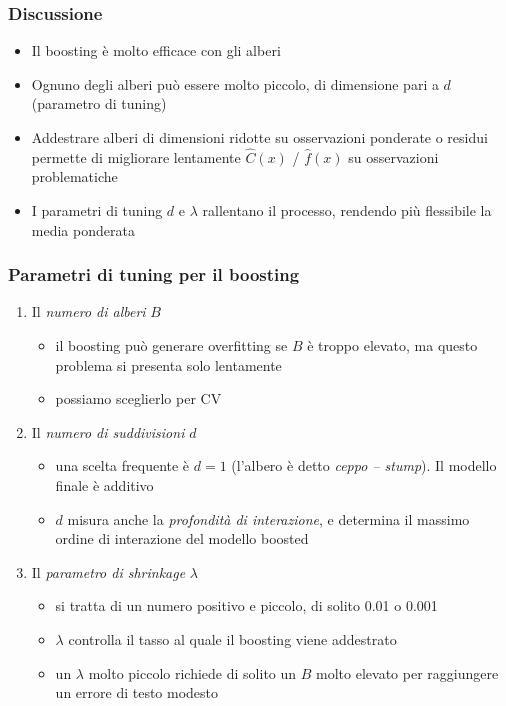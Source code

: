 \begin{frame}
	\frametitle{Discussione}
	
	\begin{itemize}
		\item Il boosting è molto efficace con gli alberi
		\item Ognuno degli alberi può essere molto piccolo, di dimensione pari a $d$ (parametro di tuning)
		\item Addestrare alberi di dimensioni ridotte su osservazioni ponderate o residui permette di migliorare lentamente $\widehat C(x)$ / $\widehat f(x)$ su osservazioni problematiche
		\item I parametri di tuning $d$ e $\lambda$ rallentano il processo, rendendo più flessibile la media ponderata
	\end{itemize}
\end{frame}


\begin{frame}
	\frametitle{Parametri di tuning per il boosting}
	
	\begin{enumerate}
		\item Il \emph{numero di alberi} $B$
			\begin{itemize}
				\item il boosting può generare overfitting se $B$ è troppo elevato, ma questo problema si presenta solo lentamente
				\item possiamo sceglierlo per CV
			\end{itemize}
		\item Il \emph{numero di suddivisioni} $d$
			\begin{itemize}
				\item una scelta frequente è $d = 1$ (l'albero è detto \emph{ceppo -- stump}). Il modello finale è additivo
				\item $d$ misura anche la \emph{profondità di interazione}, e determina il massimo ordine di interazione del modello boosted 
			\end{itemize}
		\item Il \emph{parametro di shrinkage} $\lambda$
			\begin{itemize}
				\item si tratta di un numero positivo e piccolo, di solito 0.01 o 0.001
				\item $\lambda$ controlla il tasso al quale il boosting viene addestrato
				\item un $\lambda$ molto piccolo richiede di solito un $B$ molto elevato per raggiungere un errore di testo modesto
			\end{itemize}
	\end{enumerate}
\end{frame}


